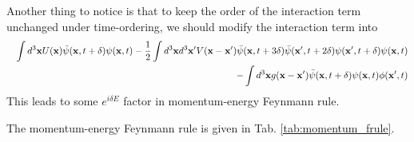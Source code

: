 \documentclass[12pt]{book}
\begin{document}
	Another thing to notice is that to keep the order of the interaction term unchanged under time-ordering, we should modify the interaction term into
	\begin{eqnarray}
		&&\int d^3{\bf x}U({\bf x})\bar\psi({\bf x},t+\delta)\psi({\bf x},t)-\frac 12\int d^3{\bf x}d^3{\bf x'}V({\bf x}-{\bf x'})\bar\psi({\bf x},t+3\delta)\bar\psi({\bf x'},t+2\delta)\psi({\bf x'},t+\delta)\psi({\bf x},t)\nonumber\\
		&&-\int d^3{\bf x} g({\bf x}-{\bf x'})\bar\psi({\bf x},t+\delta)\psi({\bf x},t)\phi({\bf x'},t)
	\end{eqnarray}
	This leads to some $e^{i\delta E}$ factor in momentum-energy Feynmann rule.
	
	The momentum-energy Feynmann rule is given in Tab. \ref{tab:momentum_frule}.
	
\end{document}

